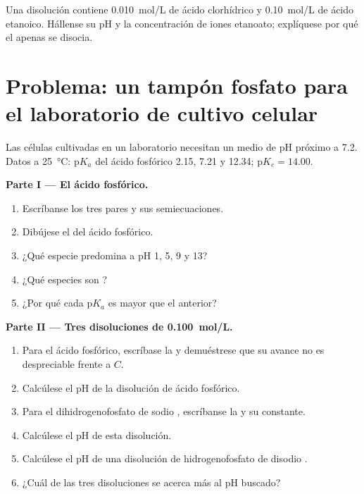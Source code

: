 \begin{exercise}[$\star\star\star$]\label{exo:b1:predominant-reaction:12}
Una disolución contiene \qty{0.010}{mol/L} de ácido clorhídrico y
\qty{0.10}{mol/L} de ácido etanoico. Hállense su pH y la concentración de
iones etanoato; explíquese por qué el  apenas se disocia.
\end{exercise}

\section{Problema: un tampón fosfato para el laboratorio de cultivo celular}

\begin{problem}
\label{pb:b1:predominant-reaction:1}
Las células cultivadas en un laboratorio necesitan un medio de pH próximo
a 7.2. Datos a \qty{25}{\celsius}: $\mathrm{p}K_a$ del ácido fosfórico
2.15, 7.21 y
12.34; $\mathrm{p}K_e = 14.00$.

\medskip
\noindent\textbf{Parte I --- El ácido fosfórico.}
\begin{enumerate}
  \item Escríbanse los tres pares y sus semiecuaciones.
  \item Dibújese el  del ácido fosfórico.
  \item ¿Qué especie predomina a pH 1, 5, 9 y 13?
  \item ¿Qué especies son ?
  \item ¿Por qué cada $\mathrm{p}K_a$ es mayor que el anterior?
\end{enumerate}

\medskip
\noindent\textbf{Parte II --- Tres disoluciones de \qty{0.100}{mol/L}.}
\begin{enumerate}[resume]
  \item Para el ácido fosfórico, escríbase la  y
        demuéstrese que su avance no es despreciable frente a $C$.
  \item Calcúlese el pH de la disolución de ácido fosfórico.
  \item Para el dihidrogenofosfato de sodio , escríbanse la
         y su constante.
  \item Calcúlese el pH de esta disolución.
  \item Calcúlese el pH de una disolución de hidrogenofosfato de disodio
        .
  \item ¿Cuál de las tres disoluciones se acerca más al pH buscado?
\end{enumerate}


\end{problem}
